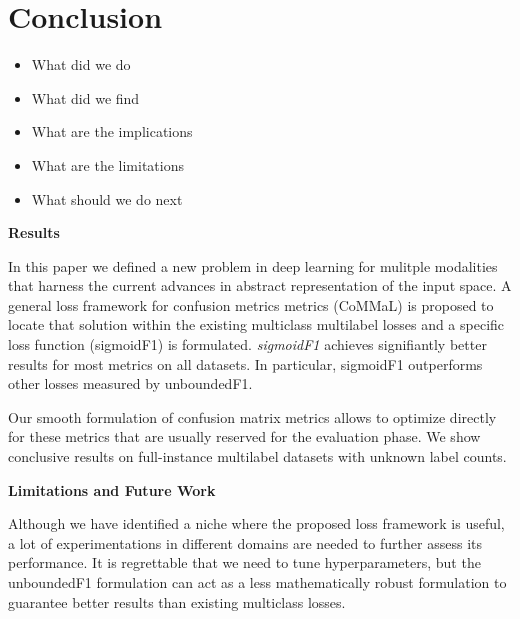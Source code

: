 
\section{Conclusion}
\label{sec:orged3d8a1}
\begin{itemize}[leftmargin=*]
\item What did we do
\item What did we find
\item What are the implications
\item What are the limitations
\item What should we do next
\end{itemize}


\textbf{Results}

In this paper we defined a new problem in deep learning for mulitple modalities that harness the current advances in abstract representation of the input space. A general loss framework for confusion metrics metrics (CoMMaL) is proposed to locate that solution within the existing multiclass multilabel losses and a specific loss function (sigmoidF1) is formulated. \emph{sigmoidF1} achieves signifiantly better results for most metrics on all datasets. In particular, sigmoidF1 outperforms other losses measured by unboundedF1.

Our smooth formulation of confusion matrix metrics allows to optimize directly for these metrics that are usually reserved for the evaluation phase. We show conclusive results on full-instance multilabel datasets with unknown label counts.

\textbf{Limitations and Future Work}

Although we have identified a niche where the proposed loss framework is useful, a lot of experimentations in different domains are needed to further assess its performance. It is regrettable that we need to tune hyperparameters, but the unboundedF1 formulation can act as a less mathematically robust formulation to guarantee better results than existing multiclass losses.







